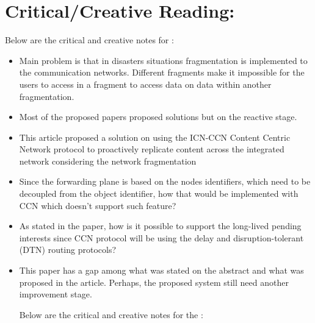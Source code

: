\documentclass{article}
\begin{document}
\section{Critical/Creative Reading:}
 Below are the critical and creative notes for \cite{8401588}:
\begin{itemize}
 
    \item Main problem is that in disasters situations fragmentation is implemented to the communication networks. Different fragments make it impossible for the users to access in a fragment to access data on data within another fragmentation.
    \item Most of the proposed papers proposed solutions but on the reactive stage. 
    \item This article proposed a solution on using the ICN-CCN Content Centric Network protocol to proactively replicate content across the integrated network considering the network fragmentation
    \item Since the forwarding plane is based on the nodes identifiers, which need to be decoupled from the object identifier, how that would be implemented with CCN which doesn't support such feature? 
    \item As stated in the paper, how is it possible to support the long-lived pending interests since CCN protocol will be using the delay and disruption-tolerant (DTN) routing protocols?
    \item This paper has a gap among what was stated on the abstract and what was proposed in the article. Perhaps, the proposed system still need another improvement stage.
    
  
Below are the critical and creative notes for the \cite{8401595}:


\end{itemize}
\end{document}
